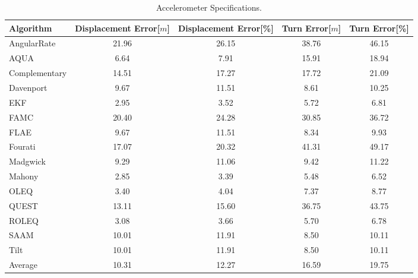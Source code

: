 \begin{table}[H]
    \begin{center}
        \begin{tabular}[t]{lcccc}
            \hline
            Algorithm                   & Displacement Error[$m$] & Displacement Error[\%]      & Turn Error[$m$]  & Turn Error[\%]             \\
            \hline 
            AngularRate            & 21.96  & 26.15 & 38.76 & 46.15              \\            AQUA            & 6.64  & 7.91 & 15.91 & 18.94              \\            Complementary            & 14.51  & 17.27 & 17.72 & 21.09              \\            Davenport            & 9.67  & 11.51 & 8.61 & 10.25              \\            EKF            & 2.95  & 3.52 & 5.72 & 6.81              \\            FAMC            & 20.40  & 24.28 & 30.85 & 36.72              \\            FLAE            & 9.67  & 11.51 & 8.34 & 9.93              \\            Fourati            & 17.07  & 20.32 & 41.31 & 49.17              \\            Madgwick            & 9.29  & 11.06 & 9.42 & 11.22              \\            Mahony            & 2.85  & 3.39 & 5.48 & 6.52              \\            OLEQ            & 3.40  & 4.04 & 7.37 & 8.77              \\            QUEST            & 13.11  & 15.60 & 36.75 & 43.75              \\            ROLEQ            & 3.08  & 3.66 & 5.70 & 6.78              \\            SAAM            & 10.01  & 11.91 & 8.50 & 10.11              \\            Tilt            & 10.01  & 11.91 & 8.50 & 10.11              \\
            \hline
            Average & 10.31 & 12.27 & 16.59 & 19.75
        \end{tabular}
        \caption{Accelerometer Specifications. }
        \label{tab:accelerometer_specification}
    \end{center}
\end{table}